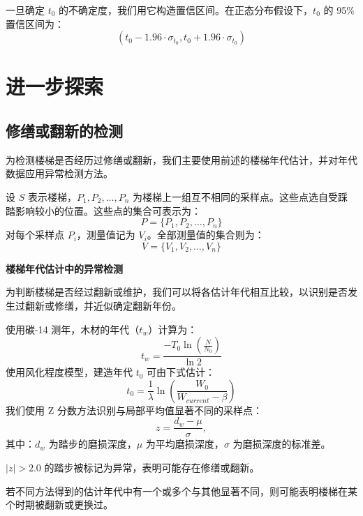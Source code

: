 \documentclass[11pt,a4paper]{ctexart}
\newcommand{\runin}[1]{\par\noindent\textbf{#1}\par\nobreak}
\begin{document}
一旦确定 $t_0$ 的不确定度，我们用它构造置信区间。在正态分布假设下，$t_0$ 的 95\% 置信区间为：
\begin{equation}
(t_0-1.96\cdot\sigma_{t_0},t_0+1.96\cdot\sigma_{t_0}) \tag{29}
\end{equation}

\section{进一步探索}

\subsection{修缮或翻新的检测}

为检测楼梯是否经历过修缮或翻新，我们主要使用前述的楼梯年代估计，并对年代数据应用异常检测方法。

设 $S$ 表示楼梯，$P_1,P_2,\dots,P_n$ 为楼梯上一组互不相同的采样点。这些点选自受踩踏影响较小的位置。这些点的集合可表示为：
\begin{equation}
P=\{P_1,P_2,\dots,P_n\} \tag{30}
\end{equation}
对每个采样点 $P_i$，测量值记为 $V_i$。全部测量值的集合则为：
\begin{equation}
V=\{V_1,V_2,\dots,V_n\} \tag{31}
\end{equation}

\runin{楼梯年代估计中的异常检测}

为判断楼梯是否经过翻新或维护，我们可以将各估计年代相互比较，以识别是否发生过翻新或修缮，并近似确定翻新年份。

使用碳-14 测年，木材的年代（$t_w$）计算为：
\begin{equation}
t_w=\frac{-T_0\ln\left(\frac{N}{N_0}\right)}{\ln 2} \tag{32}
\end{equation}
使用风化程度模型，建造年代 $t_0$ 可由下式估计：
\begin{equation}
t_0=\frac{1}{\lambda}\ln\left(\frac{W_0}{W_{current}-\beta}\right) \tag{33}
\end{equation}
我们使用 Z 分数方法识别与局部平均值显著不同的采样点：
\begin{equation}
z=\frac{d_w-\mu}{\sigma}, \tag{34}
\end{equation}
其中：$d_w$ 为踏步的磨损深度，$\mu$ 为平均磨损深度，$\sigma$ 为磨损深度的标准差。

$|z|>2.0$ 的踏步被标记为异常，表明可能存在修缮或翻新。

若不同方法得到的估计年代中有一个或多个与其他显著不同，则可能表明楼梯在某个时期被翻新或更换过。
\end{document}
